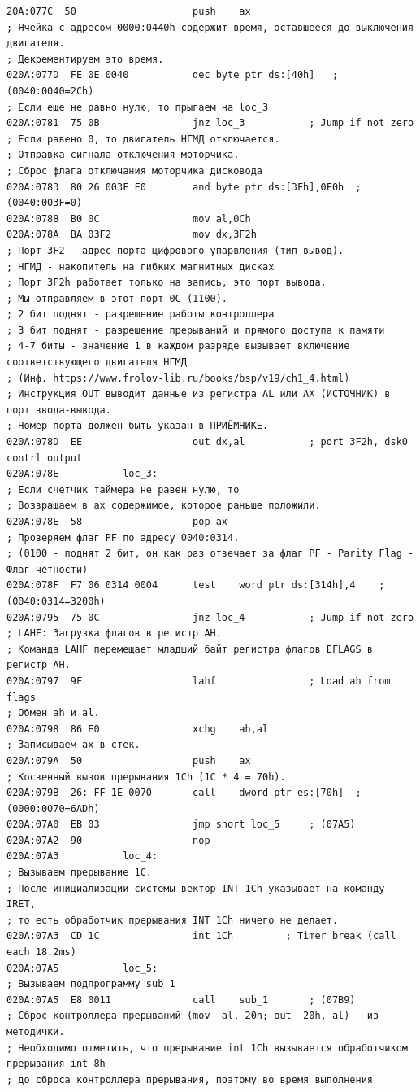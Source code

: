 \begin{lstlisting}[label=some-code,caption=Код прерывания INT 8h]
20A:077C  50					push	ax
; Ячейка с адресом 0000:0440h содержит время, оставшееся до выключения двигателя.
; Декрементируем это время. 
020A:077D  FE 0E 0040			dec	byte ptr ds:[40h]	; (0040:0040=2Ch)
; Если еще не равно нулю, то прыгаем на loc_3
020A:0781  75 0B				jnz	loc_3			; Jump if not zero
; Если равено 0, то двигатель НГМД отключается.
; Отправка сигнала отключения моторчика.
; Сброс флага отключания моторчика дисковода
020A:0783  80 26 003F F0		and	byte ptr ds:[3Fh],0F0h	; (0040:003F=0)
020A:0788  B0 0C				mov	al,0Ch
020A:078A  BA 03F2				mov	dx,3F2h
; Порт 3F2 - адрес порта цифрового упарвления (тип вывод).
; НГМД - накопитель на гибких магнитных дисках
; Порт 3F2h работает только на запись, это порт вывода.
; Мы отправляем в этот порт 0C (1100).
; 2 бит поднят - разрешение работы контроллера
; 3 бит поднят - разрешение прерываний и прямого доступа к памяти
; 4-7 биты - значение 1 в каждом разряде вызывает включение соответствующего двигателя НГМД
; (Инф. https://www.frolov-lib.ru/books/bsp/v19/ch1_4.html)
; Инструкция OUT выводит данные из регистра AL или AX (ИСТОЧНИК) в порт ввода-вывода. 
; Номер порта должен быть указан в ПРИЁМНИКЕ.
020A:078D  EE					out	dx,al			; port 3F2h, dsk0 contrl output
020A:078E			loc_3:
; Если счетчик таймера не равен нулю, то
; Возвращаем в ax содержимое, которое раньше положили.
020A:078E  58					pop	ax
; Проверяем флаг PF по адресу 0040:0314. 
; (0100 - поднят 2 бит, он как раз отвечает за флаг PF - Parity Flag - Флаг чётности)
020A:078F  F7 06 0314 0004		test	word ptr ds:[314h],4	; (0040:0314=3200h)
020A:0795  75 0C				jnz	loc_4			; Jump if not zero
; LAHF: Загрузка флагов в регистр АН.  
; Команда LAHF перемещает младший байт регистра флагов EFLAGS в регистр AH.
020A:0797  9F					lahf				; Load ah from flags
; Обмен ah и al.
020A:0798  86 E0				xchg	ah,al
; Записываем ax в стек.
020A:079A  50					push	ax
; Косвенный вызов прерывания 1Ch (1C * 4 = 70h).
020A:079B  26: FF 1E 0070		call	dword ptr es:[70h]	; (0000:0070=6ADh)
020A:07A0  EB 03				jmp	short loc_5		; (07A5)
020A:07A2  90					nop
020A:07A3			loc_4:
; Вызываем прерывание 1C.
; После инициализации системы вектор INT 1Ch указывает на команду IRET, 
; то есть обработчик прерывания INT 1Ch ничего не делает.
020A:07A3  CD 1C				int	1Ch			; Timer break (call each 18.2ms)
020A:07A5			loc_5:
; Вызываем подпрограмму sub_1
020A:07A5  E8 0011				call	sub_1		; (07B9)
; Сброс контроллера прерываний (mov  al, 20h; out  20h, al) - из методички.
; Необходимо отметить, что прерывание int 1Ch вызывается обработчиком прерывания int 8h
; до сброса контроллера прерывания, поэтому во время выполнения

\end{lstlisting}
